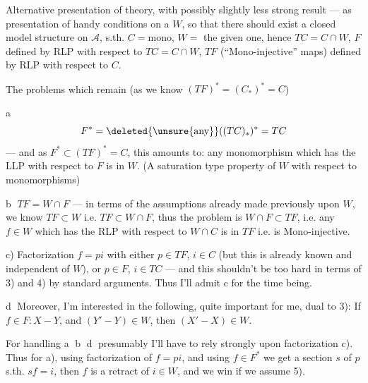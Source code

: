 
Alternative presentation of theory, with possibly slightly less strong result --- as presentation of handy  conditions on a $W$, so that there should exist a closed model structure on $\mathcal A$, s.th. $C=\text{mono}$, $W=$ the given one, hence $TC=C\cap W$, $F$ defined by  RLP with respect to $TC=C\cap W$,  $TF$ (``Mono-injective'' maps) defined by RLP with respect to $C$.

The problems which remain (as we know  $(TF)^*=(C_*)^*=C$)

\textcircled{a}
\[
F^*=\deleted{\unsure{\text{any}}}((TC)_*)^*=TC
\]
--- and as  $F^*\subset(TF)^*=C$, this amounts to: any monomorphism which has the LLP with respect to $F$ is in $W$. (A saturation type property of $W$ with respect to monomorphisms)

\textcircled{b} $TF=W\cap F$ --- in terms of the assumptions already made previously upon $W$, we know $TF\subset W$ i.e. $TF\subset W\cap F$, thus the problem is $W\cap F\subset TF$, i.e. any $f\in W$ which has the RLP with respect to $W\cap C$ is in $TF$ i.e. is Mono-injective.

c) Factorization $f=pi$ with either $p\in TF$, $i\in C$ (but this is already known and independent of $W$), or $p\in F$, $i\in TC$  --- and this shouldn't be too hard in terms of 3) and 4) by standard arguments. Thus I'll admit c for the time being.

\textcircled{d} Moreover, I'm interested in the following, quite important for me, dual to 3): If $f\in F:X-Y$, and $(Y'-Y)\in W$, then $(X'-X)\in W$.

For handling \textcircled{a} \textcircled{b} \textcircled{d} presumably I'll have to rely strongly upon factorization c). Thus for a), using factorization of $f=pi$, and using $f\in F^*$ we get a section $s$ of $p$  s.th. $sf=i$, then $f$ is a retract of $i\in W$, and we win if we assume 5).

